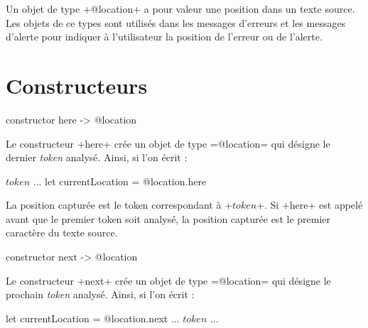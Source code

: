 



Un objet de type \ggst+@location+ a pour valeur une position dans un texte source. Les objets de ce types sont utilisés dans les messages d'erreurs et les messages d'alerte pour indiquer à l'utilisateur la position de l'erreur ou de l'alerte.











\section{Constructeurs}



\begin{galgas3}
constructor here -> @location
\end{galgas3}

Le constructeur \ggst+here+ crée un objet de type \ggst=@location= qui désigne le dernier \emph{token} analysé. Ainsi, si l'on écrit :

\begin{galgas3}
  $token$
  ...
  let currentLocation = @location.here
\end{galgas3}

La position capturée est le token correspondant à \ggst+$token$+. Si \ggst+here+ est appelé avant que le premier token soit analysé, la position capturée est le premier caractère du texte source.







\begin{galgas3}
constructor next -> @location
\end{galgas3}

Le constructeur \ggst+next+ crée un objet de type \ggst=@location= qui désigne le prochain \emph{token} analysé. Ainsi, si l'on écrit :

\begin{galgas3}
  let currentLocation = @location.next
  ...
  $token$
  ...
\end{galgas3}

